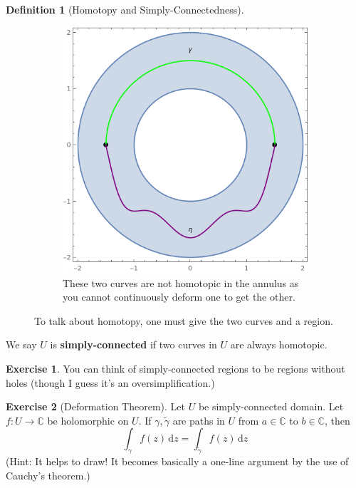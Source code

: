 \documentclass[a4paper, 12pt]{article}
\theoremstyle{definition}
\newtheorem{definition}{Definition}
\newtheorem{exercise}{Exercise}
\numberwithin{theorem}{section}
\numberwithin{definition}{section}
\numberwithin{exercise}{section}
\numberwithin{remark}{section}
\numberwithin{figure}{section}
\numberwithin{example}{section}
\newcommand{\C}{\mathbb{C}}
\newcommand{\intd}{\,\text{d}}
\begin{document}
\begin{definition}[Homotopy and Simply-Connectedness]
\begin{figure}[h]
\begin{subfigure}[b]{0.5\textwidth}
            \includegraphics[width=\textwidth]{homotopy2}
            \caption{These two curves are not homotopic in the annulus as you cannot continuously deform one to get the other.}
        \end{subfigure}
        \caption{To talk about homotopy, one must give the two curves and a region.}
        \label{fig: Homotopy}
    \end{figure}
    We say $U$ is \textbf{simply-connected} if two curves in $U$ are always homotopic.
\end{definition}
\begin{exercise}
    You can think of simply-connected regions to be regions without holes
    (though I guess it's an oversimplification.)
\end{exercise}
\begin{exercise}[Deformation Theorem]
    Let $U$ be simply-connected domain.
    Let $f:U \rightarrow \C$ be holomorphic on $U$.
    If $\gamma, \tilde\gamma$ are paths in $U$ from $a \in \C$ to $b \in \C$,
    then
    \begin{equation*}
        \int_{\gamma} f(z) \intd z = \int_{\tilde\gamma} f(z) \intd z
    \end{equation*}
    (Hint: It helps to draw! It becomes basically a one-line argument by the use of Cauchy's theorem.)
\end{exercise}
\end{document}
